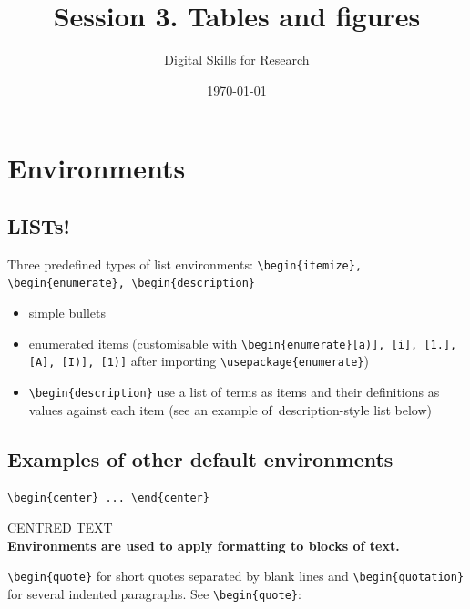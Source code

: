 \documentclass[a4paper,11pt]{article}
\title{Session 3. Tables and figures}
\author{Digital Skills for Research}
\date{\today}
\begin{document}
\clearpage
\maketitle
\thispagestyle{empty}

\tableofcontents

\section{Environments}

\subsection{LISTs!}

Three predefined types of list environments: \verb|\begin{itemize}, \begin{enumerate}, \begin{description}|

\begin{itemize}
	\item simple bullets
	\item enumerated items (customisable with \verb|\begin{enumerate}[a)], [i], [1.], [A], [I)], [1)]| after importing \verb|\usepackage{enumerate}|)
	\item \verb|\begin{description}| use a list of terms as items and their definitions as values against each item (see an example of~\hypertarget{wd:descr}{description-style list} below)
\end{itemize}

\subsection{Examples of other default environments}

\verb|\begin{center} ... \end{center}|

\begin{center}
CENTRED TEXT\\
\textbf{Environments are used to apply formatting to blocks of text.}
\end{center}

\verb|\begin{quote}| for short quotes separated by blank lines and \verb|\begin{quotation}| for several indented paragraphs. See \verb|\begin{quote}|:
\end{document}
